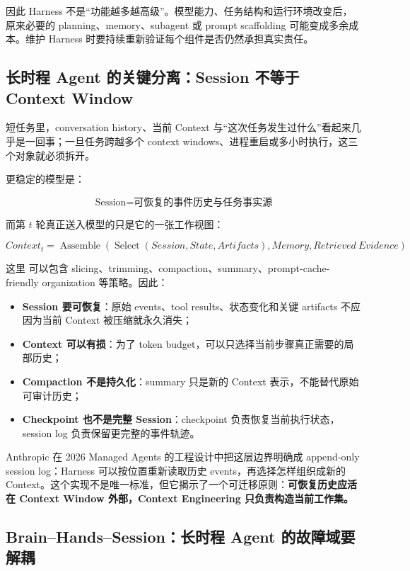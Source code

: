 \documentclass[profile=standard,twoside=false]{ipara-handbook}
\begin{document}
因此 Harness 不是“功能越多越高级”。模型能力、任务结构和运行环境改变后，原来必要的 planning、memory、subagent 或 prompt scaffolding 可能变成多余成本。维护 Harness 时要持续重新验证每个组件是否仍然承担真实责任。

\subsection{长时程 Agent 的关键分离：Session 不等于 Context Window}

短任务里，conversation history、当前 Context 与“这次任务发生过什么”看起来几乎是一回事；一旦任务跨越多个 context windows、进程重启或多小时执行，这三个对象就必须拆开。

更稳定的模型是：

$$
\boxed{
\text{Session}
=\text{可恢复的事件历史与任务事实源}
}
$$

而第 $t$ 轮真正送入模型的只是它的一张工作视图：

$$
\boxed{
Context_t
=\operatorname{Assemble}
\left(
\operatorname{Select}(Session, State, Artifacts),
Memory,
Retrieved\ Evidence
\right)
}
$$

这里  可以包含 slicing、trimming、compaction、summary、prompt-cache-friendly organization 等策略。因此：

\begin{itemize}
  \item \textbf{Session 要可恢复}：原始 events、tool results、状态变化和关键 artifacts 不应因为当前 Context 被压缩就永久消失；
  \item \textbf{Context 可以有损}：为了 token budget，可以只选择当前步骤真正需要的局部历史；
  \item \textbf{Compaction 不是持久化}：summary 只是新的 Context 表示，不能替代原始可审计历史；
  \item \textbf{Checkpoint 也不是完整 Session}：checkpoint 负责恢复当前执行状态，session log 负责保留更完整的事件轨迹。
\end{itemize}

Anthropic 在 2026 Managed Agents 的工程设计中把这层边界明确成 append-only session log：Harness 可以按位置重新读取历史 events，再选择怎样组织成新的 Context。这个实现不是唯一标准，但它揭示了一个可迁移原则：\textbf{可恢复历史应活在 Context Window 外部，Context Engineering 只负责构造当前工作集。}

\subsection{Brain--Hands--Session：长时程 Agent 的故障域要解耦}
\end{document}
